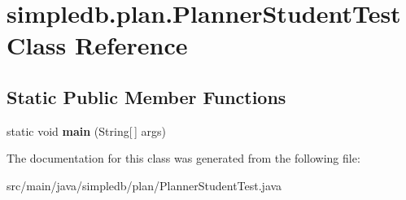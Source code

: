 \hypertarget{classsimpledb_1_1plan_1_1PlannerStudentTest}{}\section{simpledb.\+plan.\+Planner\+Student\+Test Class Reference}
\label{classsimpledb_1_1plan_1_1PlannerStudentTest}
\subsection*{Static Public Member Functions}
\begin{DoxyCompactItemize}
\item 
\mbox{\label{classsimpledb_1_1plan_1_1PlannerStudentTest_aa00efbd4adc30371f674c3b020077539}} 
static void {\bfseries main} (String\mbox{[}$\,$\mbox{]} args)
\end{DoxyCompactItemize}


The documentation for this class was generated from the following file\+:\begin{DoxyCompactItemize}
\item 
src/main/java/simpledb/plan/Planner\+Student\+Test.\+java\end{DoxyCompactItemize}
